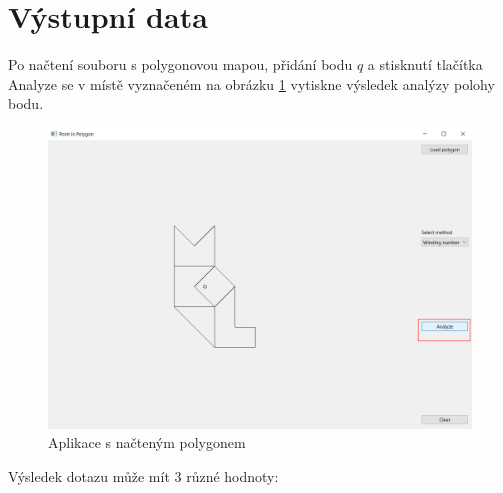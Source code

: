 \documentclass[11pt]{article}
\begin{document}
\clearpage


\section{Výstupní data}

Po načtení souboru s polygonovou mapou, přidání bodu $q$ a stisknutí tlačítka Analyze se v místě vyznačeném na obrázku \ref{fig:app_analyze} vytiskne výsledek analýzy polohy bodu. 

\begin{figure}[htbh]
	\centering
	\includegraphics[scale=0.4]{images/aplikace_klik_analyze.png} 
	\caption{Aplikace s načteným polygonem}
	\label{fig:app_analyze}
\end{figure} 

Výsledek dotazu může mít 3 různé hodnoty:
\end{document}
